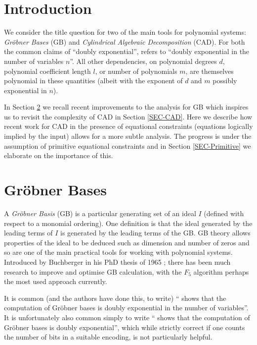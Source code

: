 \documentclass{llncs}
\begin{document}
\section{Introduction}
\label{SEC-Intro}

We consider the title question for two of the main tools for polynomial systems: \emph{Gr\"obner Bases} (GB) and \emph{Cylindrical Algebraic Decomposition} (CAD).  For both the common claims of ``doubly exponential'', refers to ``doubly exponential in the number of variables $n$''.  All other dependencies, on polynomial degrees $d$, polynomial coefficient length $l$, or number of polynomials $m$, are themselves polynomial in these quantities (albeit with the exponent of $d$ and $m$ possibly exponential in $n$).  

In Section \ref{SEC-GB} we recall recent improvements to the analysis for GB which inspires us to revisit the complexity of CAD in Section \ref{SEC-CAD}.  Here we describe how recent work for CAD in the presence of equational constraints (equations logically implied by the input) allows for a more subtle analysis. The progress is under the assumption of primitive equational constraints and in Section \ref{SEC-Primitive} we elaborate on the importance of this.

\section{Gr\"obner Bases}
\label{SEC-GB}

A \emph{Gr\"{o}bner Basis} (GB) is a particular generating set of an ideal $I$ (defined with respect to a monomial ordering).  One definition is that the ideal generated by the leading terms of $I$ is generated by the leading terms of the GB.  GB theory allows properties of the ideal to be deduced such as dimension and number of zeros and so are one of the main practical tools for working with polynomial systems.  Introduced by Buchberger in his PhD thesis of 1965 \cite{Buchberger2006}; there has been much research to improve and optimise GB calculation, with the $F_5$ algorithm \cite{Faugere2002} perhaps the most used approach currently. 

It is common (and the authors have done this, to write) ``\cite{MM82} shows that the computation of Gr\"obner bases is doubly exponential in the number of variables''.  It is unfortunately also common simply to write ``\cite{MM82} shows that the computation of Gr\"obner bases is doubly exponential'', which while strictly correct if one counts the number of bits in a suitable encoding, is not particularly helpful.
\end{document}

